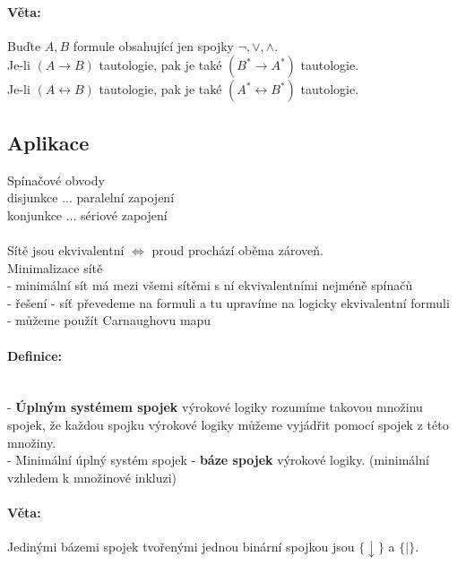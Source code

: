 \paragraph*{Věta:}
Buďte $A, B$ formule obsahující jen spojky $\neg , \vee , \wedge $.\\
Je-li $(A \rightarrow B)$ tautologie, pak je také $(B^* \rightarrow A^* )$ tautologie.\\
Je-li $(A \leftrightarrow B)$ tautologie, pak je také $(A^* \leftrightarrow B^* )$ tautologie.

\subsection*{Aplikace}
Spínačové obvody\\
disjunkce ... paralelní zapojení\\
konjunkce ... sériové zapojení\\
~\\
Sítě jsou ekvivalentní $\Leftrightarrow $ proud prochází oběma zároveň.\\
Minimalizace sítě\\
- minimální sít má mezi všemi sítěmi s ní ekvivalentními nejméně spínačů\\
- řešení - síť převedeme na formuli a tu upravíme na logicky ekvivalentní formuli\\
- můžeme použít Carnaughovu mapu

\paragraph*{Definice:}~\\
- \textbf{Úplným systémem spojek} výrokové logiky rozumíme takovou množinu spojek, že každou spojku výrokové logiky můžeme vyjádřit pomocí spojek z této množiny.\\
- Minimální úplný systém spojek - \textbf{báze spojek} výrokové logiky. (minimální vzhledem k množinové inkluzi)

\paragraph*{Věta:}
Jedinými bázemi spojek tvořenými jednou binární spojkou jsou $ \{ \downarrow \} $ a $ \{ \mid \} $.
